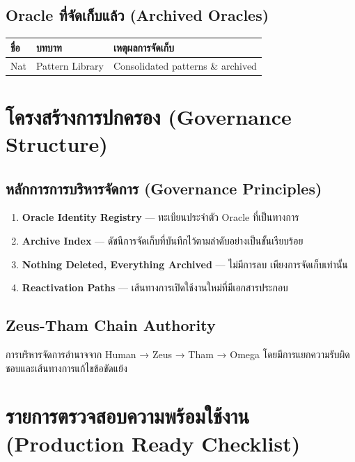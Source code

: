 \documentclass[11pt]{article}
\begin{document}
\subsection{Oracle ที่จัดเก็บแล้ว (Archived Oracles)}

\begin{center}
\begin{tabularx}{\textwidth}{|l|l|X|}
    \hline
    \textbf{ชื่อ} & \textbf{บทบาท} & \textbf{เหตุผลการจัดเก็บ} \\
    \hline
    Nat & Pattern Library & Consolidated patterns \& archived \\
    \hline
\end{tabularx}
\end{center}

\section{โครงสร้างการปกครอง (Governance Structure)}

\subsection{หลักการการบริหารจัดการ (Governance Principles)}

\begin{enumerate}
    \item \textbf{Oracle Identity Registry} — ทะเบียนประจำตัว Oracle ที่เป็นทางการ
    \item \textbf{Archive Index} — ดัชนีการจัดเก็บที่บันทึกไว้ตามลำดับอย่างเป็นขั้นเรียบร้อย
    \item \textbf{Nothing Deleted, Everything Archived} — ไม่มีการลบ เพียงการจัดเก็บเท่านั้น
    \item \textbf{Reactivation Paths} — เส้นทางการเปิดใช้งานใหม่ที่มีเอกสารประกอบ
\end{enumerate}

\subsection{Zeus-Tham Chain Authority}

การบริหารจัดการอำนาจจาก Human → Zeus → Tham → Omega โดยมีการแยกความรับผิดชอบและเส้นทางการแก้ไขข้อขัดแย้ง

\section{รายการตรวจสอบความพร้อมใช้งาน (Production Ready Checklist)}
\end{document}
